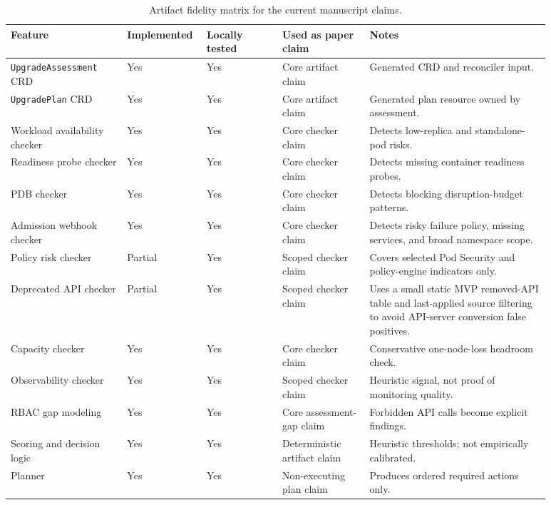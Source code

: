 \documentclass[10pt,journal]{IEEEtran}
\newcommand{\crd}[1]{\texttt{#1}}
\begin{document}
\begin{table}[t]
  \centering
  \caption{Artifact fidelity matrix for the current manuscript claims.}
  \label{tab:fidelity-matrix}
  \scriptsize
  \begin{tabular}{p{0.20\linewidth}p{0.09\linewidth}p{0.13\linewidth}p{0.15\linewidth}p{0.31\linewidth}}
    \toprule
    Feature & Implemented & Locally tested & Used as paper claim & Notes \\
    \midrule
    \crd{UpgradeAssessment} CRD & Yes & Yes & Core artifact claim & Generated CRD and reconciler input. \\
    \crd{UpgradePlan} CRD & Yes & Yes & Core artifact claim & Generated plan resource owned by assessment. \\
    Workload availability checker & Yes & Yes & Core checker claim & Detects low-replica and standalone-pod risks. \\
    Readiness probe checker & Yes & Yes & Core checker claim & Detects missing container readiness probes. \\
    PDB checker & Yes & Yes & Core checker claim & Detects blocking disruption-budget patterns. \\
    Admission webhook checker & Yes & Yes & Core checker claim & Detects risky failure policy, missing services, and broad namespace scope. \\
    Policy risk checker & Partial & Yes & Scoped checker claim & Covers selected Pod Security and policy-engine indicators only. \\
    Deprecated API checker & Partial & Yes & Scoped checker claim & Uses a small static MVP removed-API table and last-applied source filtering to avoid API-server conversion false positives. \\
    Capacity checker & Yes & Yes & Core checker claim & Conservative one-node-loss headroom check. \\
    Observability checker & Yes & Yes & Scoped checker claim & Heuristic signal, not proof of monitoring quality. \\
    RBAC gap modeling & Yes & Yes & Core assessment-gap claim & Forbidden API calls become explicit findings. \\
    Scoring and decision logic & Yes & Yes & Deterministic artifact claim & Heuristic thresholds; not empirically calibrated. \\
    Planner & Yes & Yes & Non-executing plan claim & Produces ordered required actions only. \\
    \bottomrule
  \end{tabular}
\end{table}
\end{document}
